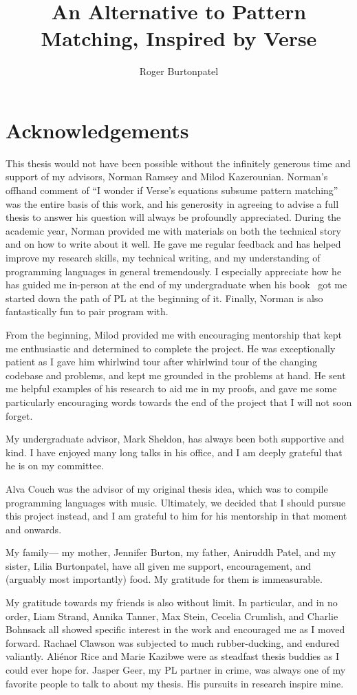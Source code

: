 \documentclass[manuscript,screen,review, 12pt, nonacm]{acmart}
\title{An Alternative to Pattern Matching, Inspired by Verse}
\author{Roger Burtonpatel}
\affiliation{%
\institution{Tufts University}
\streetaddress{419 Boston Ave}
  \city{Medford}
  \state{Massachusetts}
  \country{USA}
  \postcode{02155}
  }
\begin{document}
\section{Acknowledgements}

This thesis would not have been possible without the infinitely generous time
and support of my advisors, Norman Ramsey and Milod Kazerounian. Norman's
offhand comment of “I wonder if Verse's equations subsume pattern matching” was
the entire basis of this work, and his generosity in agreeing to advise a full
thesis to answer his question will always be profoundly appreciated. During the
academic year, Norman provided me with materials on both the technical story and
on how to write about it well. He gave me regular feedback and has helped
improve my research skills, my technical writing, and my understanding of
programming languages in general tremendously. I especially appreciate how he
has guided me in-person at the end of my undergraduate when his book~\citep{bpc}
got me started down the path of PL at the beginning of it. Finally, Norman is
also fantastically fun to pair program with. 

From the beginning, Milod provided me with encouraging mentorship that kept
me enthusiastic and determined to complete the project. He was exceptionally
patient as I gave him whirlwind tour after whirlwind tour of the changing
codebase and problems, and kept me grounded in the problems at hand. He 
sent me helpful examples of his research to aid me in my proofs, and gave me
some particularly encouraging words towards the end of the project that I 
will not soon forget. 

My undergraduate advisor, Mark Sheldon, has always been both supportive and
kind. I have enjoyed many long talks in his office, and I am deeply grateful
that he is on my committee. 

Alva Couch was the advisor of my original thesis idea, which was to compile
programming languages with music. Ultimately, we decided that I should pursue
this project instead, and I am grateful to him for his mentorship in that moment
and onwards. 

My family--- my mother, Jennifer Burton, my father, Aniruddh Patel, and my
sister, Lilia Burtonpatel, have all given me support, encouragement, and
(arguably most importantly) food. My gratitude for them is immeasurable. 

My gratitude towards my friends is also without limit. In particular, and in
no order, Liam Strand, Annika Tanner, Max Stein, Cecelia Crumlish, and
Charlie Bohnsack all showed specific interest in the work and encouraged me
as I moved forward. Rachael Clawson was subjected to much rubber-ducking,
and endured valiantly. Aliénor Rice and Marie Kazibwe were as steadfast
thesis buddies as I could ever hope for. Jasper Geer, my PL partner in
crime, was always one of my favorite people to talk to about my thesis. His
pursuits in research inspire mine. 
\end{document}
